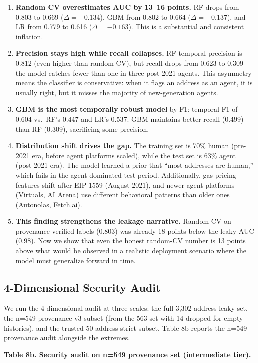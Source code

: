 \documentclass[sigconf,nonacm=false]{acmart}
\begin{document}
\begin{enumerate}
    \item \textbf{Random CV overestimates AUC by 13--16 points.} RF drops from 0.803 to 0.669 ($\Delta = -0.134$), GBM from 0.802 to 0.664 ($\Delta = -0.137$), and LR from 0.779 to 0.616 ($\Delta = -0.163$). This is a substantial and consistent inflation.
    \item \textbf{Precision stays high while recall collapses.} RF temporal precision is 0.812 (even higher than random CV), but recall drops from 0.623 to 0.309---the model catches fewer than one in three post-2021 agents. This asymmetry means the classifier is conservative: when it flags an address as an agent, it is usually right, but it misses the majority of new-generation agents.
    \item \textbf{GBM is the most temporally robust model} by F1: temporal F1 of 0.604 vs.\ RF's 0.447 and LR's 0.537. GBM maintains better recall (0.499) than RF (0.309), sacrificing some precision.
    \item \textbf{Distribution shift drives the gap.} The training set is 70\% human (pre-2021 era, before agent platforms scaled), while the test set is 63\% agent (post-2021 era). The model learned a prior that ``most addresses are human,'' which fails in the agent-dominated test period. Additionally, gas-pricing features shift after EIP-1559 (August 2021), and newer agent platforms (Virtuals, AI Arena) use different behavioral patterns than older ones (Autonolas, Fetch.ai).
    \item \textbf{This finding strengthens the leakage narrative.} Random CV on provenance-verified labels (0.803) was already 18 points below the leaky AUC (0.98). Now we show that even the honest random-CV number is 13 points above what would be observed in a realistic deployment scenario where the model must generalize forward in time.
\end{enumerate}

\subsection{4-Dimensional Security Audit}

We run the 4-dimensional audit at three scales: the full 3,302-address leaky set, the n=549 provenance v3 subset (from the 563 set with 14 dropped for empty histories), and the trusted 50-address strict subset. Table 8b reports the n=549 provenance audit alongside the extremes.

\textbf{Table 8b. Security audit on n=549 provenance set (intermediate tier).}
\end{document}

